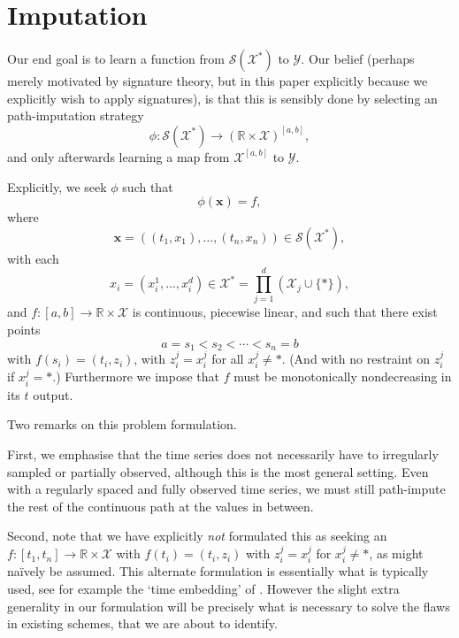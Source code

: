 \documentclass{article}
\newcommand{\reals}{\mathbb{R}}
\newcommand{\dataspace}{\mathcal{X}}
\newcommand{\lspace}{\mathcal{Y}}
\newcommand{\seriesspace}{\mathcal{S}}
\begin{document}
\section{Imputation}

Our end goal is to learn a function from $\seriesspace(\dataspace^*)$ to $\lspace$. Our belief (perhaps merely motivated by signature theory, but in this paper explicitly because we explicitly wish to apply signatures), is that this is sensibly done by selecting an path-imputation strategy
\begin{equation*}
    \phi \colon \seriesspace(\dataspace^*) \to (\reals \times \dataspace)^{[a, b]},
\end{equation*}
and only afterwards learning a map from $\dataspace^{[a, b]}$ to $\lspace$.

Explicitly, we seek $\phi$ such that
\begin{equation}\label{eq:phi}
\phi(\mathbf{x}) = f,    
\end{equation}
where
\begin{equation*}
\mathbf{x} = ((t_1, x_1), \ldots, (t_n, x_n)) \in \seriesspace(\dataspace^*),    
\end{equation*}
with each
\begin{equation*}
    x_i = (x_i^1, \ldots, x_i^d) \in \dataspace^* = \prod_{j = 1}^d (\dataspace_j \cup \{*\}),
\end{equation*}
and $f \colon [a, b] \to \reals \times \dataspace$ is continuous, piecewise linear, and such that there exist points
\begin{equation}\label{eq:ss}
a = s_1 < s_2 < \cdots < s_n = b    
\end{equation}
with $f(s_i) = (t_i, z_i)$, with $z_i^j = x_i^j$ for all $x_i^j \neq *$. (And with no restraint on $z_i^j$ if $x_i^j = *$.) Furthermore we impose that $f$ must be monotonically nondecreasing in its $t$ output.

Two remarks on this problem formulation.

First, we emphasise that the time series does not necessarily have to irregularly sampled or partially observed, although this is the most general setting. Even with a regularly spaced and fully observed time series, we must still path-impute the rest of the continuous path at the values in between.

Second, note that we have explicitly \emph{not} formulated this as seeking an $f \colon [t_1, t_n] \to \reals \times \dataspace$ with $f(t_i) = (t_i, z_i)$ with $z_i^j = x_i^j$ for $x_i^j \neq *$, as might na{\"i}vely be assumed. This alternate formulation is essentially what is typically used, see for example the `time embedding' of \citet{fermanian2019embedding}. However the slight extra generality in our formulation will be precisely what is necessary to solve the flaws in existing schemes, that we are about to identify.
\end{document}
